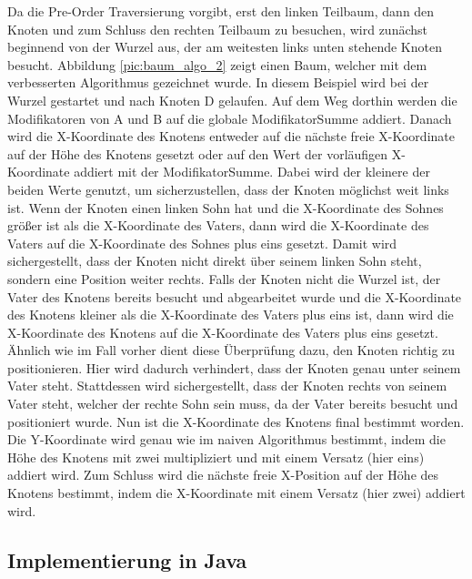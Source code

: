Da die Pre-Order Traversierung vorgibt, erst den linken Teilbaum, dann den Knoten und zum Schluss den rechten Teilbaum zu besuchen,
wird zunächst beginnend von der Wurzel aus, der am weitesten links unten stehende Knoten besucht. Abbildung \ref{pic:baum_algo_2}
zeigt einen Baum, welcher mit dem verbesserten Algorithmus gezeichnet wurde. In diesem Beispiel wird bei der Wurzel gestartet 
und nach Knoten D gelaufen. Auf dem Weg dorthin werden die Modifikatoren von A und B auf die globale ModifikatorSumme addiert.
Danach wird die X-Koordinate des Knotens entweder auf die nächste freie X-Koordinate auf der Höhe des Knotens gesetzt oder auf den
Wert der vorläufigen X-Koordinate addiert mit der ModifikatorSumme. Dabei wird der kleinere der beiden Werte genutzt, um sicherzustellen,
dass der Knoten möglichst weit links ist. Wenn der Knoten einen linken Sohn hat und die X-Koordinate des Sohnes größer ist als
die X-Koordinate des Vaters, dann wird die X-Koordinate des Vaters auf die X-Koordinate des Sohnes plus eins gesetzt. 
Damit wird sichergestellt, dass der Knoten nicht direkt über seinem linken Sohn steht, sondern eine Position weiter rechts.
Falls der Knoten nicht die Wurzel ist, der Vater des Knotens bereits besucht und abgearbeitet wurde und die X-Koordinate des Knotens
kleiner als die X-Koordinate des Vaters plus eins ist, dann wird die X-Koordinate des Knotens auf die X-Koordinate des Vaters plus eins gesetzt.
Ähnlich wie im Fall vorher dient diese Überprüfung dazu, den Knoten richtig zu positionieren. Hier wird dadurch verhindert,
dass der Knoten genau unter seinem Vater steht. Stattdessen wird sichergestellt, dass der Knoten rechts von seinem Vater steht,
welcher der rechte Sohn sein muss, da der Vater bereits besucht und positioniert wurde. 
Nun ist die X-Koordinate des Knotens final bestimmt worden. Die Y-Koordinate wird genau wie im naiven Algorithmus bestimmt, 
indem die Höhe des Knotens mit zwei multipliziert und mit einem Versatz (hier eins) addiert wird. Zum Schluss wird die nächste 
freie X-Position auf der Höhe des Knotens bestimmt, indem die X-Koordinate mit einem Versatz (hier zwei) addiert wird. 


\subsection{Implementierung in Java}


